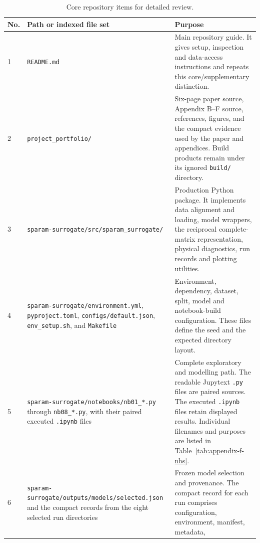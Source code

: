 \begin{table}[!htbp]
    \caption{Core repository items for detailed review.}
    \label{tab:appendix-f-core}
    \centering
    \scriptsize
    \begin{tabular}{@{}p{}p{}
                         p{}@{}}
        \toprule
        No. & Path or indexed file set & Purpose \\
        \midrule
        1
          & \nolinkurl{README.md}
          & Main repository guide. It gives setup, inspection and data-access
            instructions and repeats this core/supplementary distinction. \\
        2
          & \nolinkurl{project_portfolio/}
          & Six-page paper source, Appendix B--F source, references, figures,
            and the compact evidence used by the paper and appendices. Build
            products remain under its ignored \nolinkurl{build/} directory. \\
        3
          & \nolinkurl{sparam-surrogate/src/sparam_surrogate/}
          & Production Python package. It implements data alignment and loading,
            model wrappers, the reciprocal complete-matrix representation,
            physical diagnostics, run records and plotting utilities. \\
        4
          & \nolinkurl{sparam-surrogate/environment.yml},
            \nolinkurl{pyproject.toml}, \nolinkurl{configs/default.json},
            \nolinkurl{env_setup.sh}, and \nolinkurl{Makefile}
          & Environment, dependency, dataset, split, model and notebook-build
            configuration. These files define the seed and the expected
            directory layout. \\
        5
          & \nolinkurl{sparam-surrogate/notebooks/nb01_*.py} through
            \nolinkurl{nb08_*.py}, with their paired executed
            \nolinkurl{.ipynb} files
          & Complete exploratory and modelling path. The readable Jupytext
            \nolinkurl{.py} files are paired sources. The executed
            \nolinkurl{.ipynb} files retain displayed results. Individual
            filenames and purposes are listed in Table~\ref{tab:appendix-f-nbs}.
            \\
        6
          & \nolinkurl{sparam-surrogate/outputs/models/selected.json} and the
            compact records from the eight selected run directories
          & Frozen model selection and provenance. The compact record for each
            run comprises configuration, environment, manifest, metadata,

\end{tabular}
\end{table}
